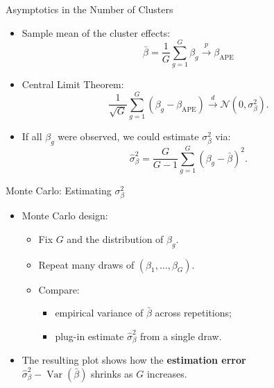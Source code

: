 \documentclass[
  ignorenonframetext,
]{beamer}
\providecommand{\tightlist}{%
  \setlength{\itemsep}{0pt}\setlength{\parskip}{0pt}}
\begin{document}
\begin{frame}{Asymptotics in the Number of Clusters}
\label{asymptotics-in-the-number-of-clusters}
\begin{itemize}
\tightlist
\item
  Sample mean of the cluster effects: \[
  \bar{\beta} = \frac{1}{G}\sum_{g=1}^G \beta_g
  \xrightarrow{p} \beta_{\text{APE}}
  \]
\item
  Central Limit Theorem: \[
  \frac{1}{\sqrt{G}} \sum_{g=1}^G (\beta_g - \beta_{\text{APE}})
  \xrightarrow{d} \mathcal{N}(0,\sigma^2_\beta).
  \]
\item
  If all \(\beta_g\) were observed, we could estimate \(\sigma^2_\beta\)
  via: \[
  \hat{\sigma}^2_\beta
  = \frac{G}{G-1} \sum_{g=1}^G (\beta_g - \bar{\beta})^2.
  \]
\end{itemize}
\end{frame}

\begin{frame}{Monte Carlo: Estimating \(\sigma^2_\beta\)}
\label{monte-carlo-estimating-sigma2_beta}
\begin{itemize}
\tightlist
\item
  Monte Carlo design:

  \begin{itemize}
  \tightlist
  \item
    Fix \(G\) and the distribution of \(\beta_g\).
  \item
    Repeat many draws of \((\beta_1,\dots,\beta_G)\).
  \item
    Compare:

    \begin{itemize}
    \tightlist
    \item
      empirical variance of \(\bar{\beta}\) across repetitions;
    \item
      plug-in estimate \(\hat{\sigma}^2_\beta\) from a single draw.
    \end{itemize}
  \end{itemize}
\item
  The resulting plot shows how the \textbf{estimation error}\\
  \(\hat{\sigma}^2_\beta - \operatorname{Var}(\bar{\beta})\) shrinks as
  \(G\) increases.
\end{itemize}
\end{frame}
\end{document}
